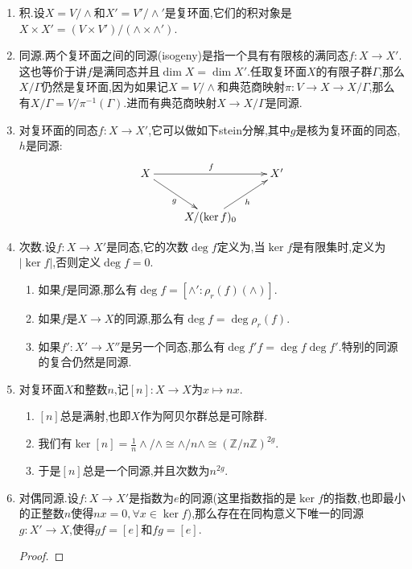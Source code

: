 \begin{enumerate}
\begin{proof}
		$\mathrm{im}f$是复环面是因为它是连通紧复李群,或者$F(V)\cap\wedge'$是$F(V)$的格(因为它离散,它包含了$F(\wedge)$导致它$\mathbb{R}$生成了整个$F(V)$).按照$\ker f$是紧集的闭子集,所以仍然是紧的,所以只有有限个连通分支.只剩下证明$(\ker f)_0$是复环面.这是因为有$(\ker f)_0=F^{-1}(\wedge')_0/(F^{-1}(\wedge')\cap\wedge)$.并且$F^{-1}(\wedge')_0$是线性子空间:如果$v\in F^{-1}(\wedge')_0$,那么存在有限折点的折线段使得$v$和$w$相连,取临近$v$的线段,另一个端点记作$w$,那么有$(1-t)v+tw\in F^{-1}(\wedge')_0,\forall0\le t\le1$,进而有$(1-t)F(v)+tF(w)\in\wedge'$.但是$\wedge'$是离散的,迫使$(1-t)F(v)+tF(w)$是常值的,也即$F(w)=F(v)=0$,特别的有$0$到$v$的连线在$F^{-1}(\wedge')$中,进而它必须在$F^{-1}(\wedge')_0$中.最后按照$\ker f$是紧集的闭子集,于是紧,迫使$(\ker f)_0$是紧的,进而$F^{-1}(\wedge')\cap\wedge$是$F^{-1}(\wedge')_0$的完备格.
	\end{proof}
	\item 积.设$X=V/\wedge$和$X'=V'/\wedge'$是复环面,它们的积对象是$X\times X'=(V\times V')/(\wedge\times\wedge')$.
	\item 同源.两个复环面之间的同源(isogeny)是指一个具有有限核的满同态$f:X\to X'$.这也等价于讲$f$是满同态并且$\dim X=\dim X'$.任取复环面$X$的有限子群$\Gamma$,那么$X/\Gamma$仍然是复环面,因为如果记$X=V/\wedge$和典范商映射$\pi:V\to X\to X/\Gamma$,那么有$X/\Gamma=V/\pi^{-1}(\Gamma)$.进而有典范商映射$X\to X/\Gamma$是同源.
	\item 对复环面的同态$f:X\to X'$,它可以做如下stein分解,其中$g$是核为复环面的同态,$h$是同源:
	$$\xymatrix{X\ar[rr]^f\ar[dr]_g&&X'\\&X/(\ker f)_0\ar[ur]_h&}$$
	\item 次数.设$f:X\to X'$是同态,它的次数$\deg f$定义为,当$\ker f$是有限集时,定义为$|\ker f|$,否则定义$\deg f=0$.
	\begin{enumerate}[(1)]
		\item 如果$f$是同源,那么有$\deg f=[\wedge':\rho_r(f)(\wedge)]$.
		\item 如果$f$是$X\to X$的同源,那么有$\deg f=\deg\rho_r(f)$.
		\item 如果$f':X'\to X''$是另一个同态,那么有$\deg f'f=\deg f\deg f'$.特别的同源的复合仍然是同源.
	\end{enumerate}
    \item 对复环面$X$和整数$n$,记$[n]:X\to X$为$x\mapsto nx$.
    \begin{enumerate}[(1)]
    	\item $[n]$总是满射,也即$X$作为阿贝尔群总是可除群.
    	\item 我们有$\ker[n]=\frac{1}{n}\wedge/\wedge\cong\wedge/n\wedge\cong(\mathbb{Z}/n\mathbb{Z})^{2g}$.
    	\item 于是$[n]$总是一个同源,并且次数为$n^{2g}$.
    \end{enumerate}
    \item 对偶同源.设$f:X\to X'$是指数为$e$的同源(这里指数指的是$\ker f$的指数,也即最小的正整数$n$使得$nx=0,\forall x\in\ker f$),那么存在在同构意义下唯一的同源$g:X'\to X$,使得$gf=[e]$和$fg=[e]$.
    \begin{proof}
    	

\end{proof}
\end{enumerate}
